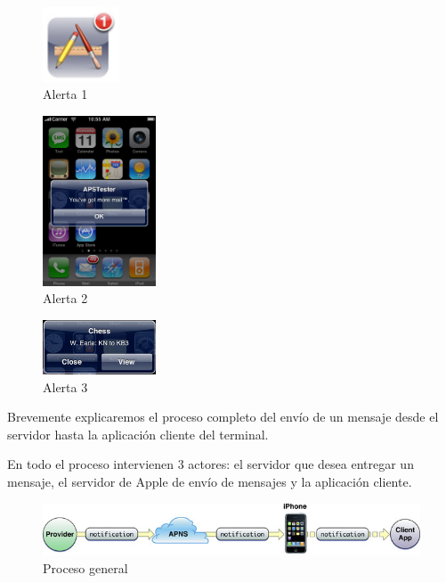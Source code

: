      \begin{figure}[h!]
    \centering
       \includegraphics[width=0.2\textwidth]{./images/badged_app.jpg}
     \caption{Alerta 1 }
   \label{fig:Alerta 1}
\end{figure}

\begin{figure}[h!]
    \centering
       \includegraphics[width=0.3\textwidth]{./images/notif_msg_one_button.jpg}
     \caption{Alerta 2 }
   \label{fig:Alerta 2}
\end{figure}

\begin{figure}[h!]
    \centering
       \includegraphics[width=0.3\textwidth]{./images/alert.jpg}
     \caption{Alerta 3 }
   \label{fig:Alerta 3}
\end{figure}

     
    Brevemente explicaremos el proceso completo del envío de un mensaje desde el servidor hasta la aplicación cliente del terminal. 
    
    En todo el proceso intervienen 3 actores: el servidor que desea entregar un mensaje, el servidor de Apple de envío de mensajes y la aplicación cliente.
    
 \begin{figure}[h!]
    \centering
       \includegraphics[width=1.1\textwidth]{./images/remote_notif_simple.jpg}
     \caption{Proceso general }
   \label{fig:Notificacion proceso}
\end{figure}
